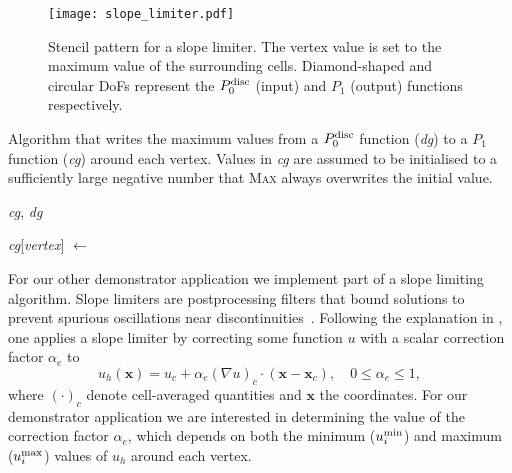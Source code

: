 \documentclass[thesis]{subfiles}
\begin{document}
\begin{figure}
  \centering
  \texttt{[image: slope\_limiter.pdf]}
  \caption{
    Stencil pattern for a slope limiter.
    The vertex value is set to the maximum value of the surrounding cells.
    Diamond-shaped and circular DoFs represent the $P_0^\textnormal{disc}$ (input) and $P_1$ (output) functions respectively.
  }
  \label{fig:slope_limiter_stencil}
\end{figure}

\begin{algorithm}
  \caption{
    Algorithm that writes the maximum values from a $P_0^\textnormal{disc}$ function (\textit{dg}) to a $P_1$ function (\textit{cg}) around each vertex.
    Values in \textit{cg} are assumed to be initialised to a sufficiently large negative number that \textsc{Max} always overwrites the initial value.
  }

  \begin{algorithmic}[1]
    \Require \textit{cg}, \textit{dg} 

       
        \State \textit{cg}[\textit{vertex}] $\gets$ 
      \EndFor
    \EndFor
  \end{algorithmic}
  \label{alg:slope_limiter}
\end{algorithm}

For our other demonstrator application we implement part of a slope limiting algorithm.
Slope limiters are postprocessing filters that bound solutions to prevent spurious oscillations near discontinuities~\cite{biswasParallelAdaptiveFinite1994}.
Following the explanation in \cite{kuzminVertexbasedHierarchicalSlope2010}, one applies a slope limiter by correcting some function $u$ with a scalar correction factor $\alpha_e$ to
\begin{equation}
  u_h(\mathbf{x}) = u_c + \alpha_e(\nabla u)_c \cdot (\mathbf{x} - \mathbf{x}_c), \quad 0 \leq \alpha_e \leq 1 ,
\end{equation}
where $(\cdot)_c$ denote cell-averaged quantities and $\mathbf{x}$ the coordinates.
For our demonstrator application we are interested in determining the value of the correction factor $\alpha_e$, which depends on both the minimum ($u_i^{\textnormal{min}}$) and maximum ($u_i^{\textnormal{max}}$) values of $u_h$ around each vertex.
\end{document}
